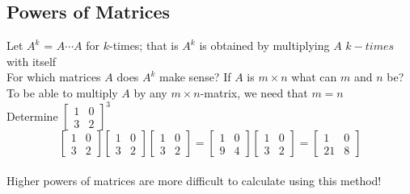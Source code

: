 \subsection{Powers of Matrices}
Let $A^k$ = $A \cdots A$ for $k$-times; that is $A^k$ is obtained by multiplying
$A$ $k-times$ with itself
\\[8pt]
For which matrices $A$ does $A^k$ make sense? If $A$ is $m \times n$ what can 
$m$ and $n$ be?
\\[8pt]
To be able to multiply $A$ by any $m \times n$-matrix, we need that $m = n$
\\[8pt]
Determine $\begin{bmatrix}
  1 & 0 \\
  3 & 2
\end{bmatrix}^3$
\\[8pt]
\[
\begin{bmatrix}
  1 & 0 \\
  3 & 2
\end{bmatrix} \begin{bmatrix}
  1 & 0 \\
  3 & 2
\end{bmatrix} \begin{bmatrix}
  1 & 0 \\
  3 & 2
\end{bmatrix} = \begin{bmatrix}
  1 & 0 \\
  9 & 4
\end{bmatrix} \begin{bmatrix}
  1 & 0 \\
  3 & 2
\end{bmatrix} = \begin{bmatrix}
  1 & 0 \\
  21 & 8
\end{bmatrix}
\]
\\[8pt]
Higher powers of matrices are more difficult to calculate using this method!


